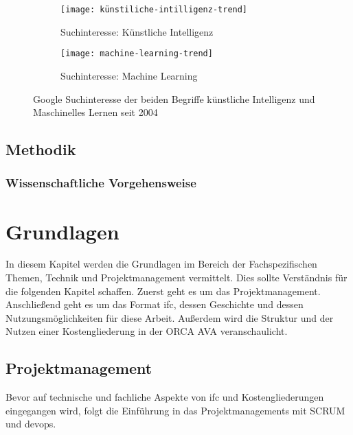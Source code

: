 \begin{figure}[h]
	\centering
	
	\begin{subfigure}{0.99\textwidth}
		\centering
	\texttt{[image: künstiliche-intilligenz-trend]}
		\caption{Suchinteresse: Künstliche Intelligenz}
		\label{FIG:ki-trend}
	\end{subfigure}
	\hspace{1cm}
	\begin{subfigure}{0.99\textwidth}
		\centering
	\texttt{[image: machine-learning-trend]}
		\caption{Suchinteresse: Machine Learning}
		\label{FIG:ml-trend}
	\end{subfigure}
	
	\caption[Google Trends]{Google Suchinteresse der beiden Begriffe \glqq künstliche Intelligenz\grqq{} und \glqq Maschinelles Lernen{} seit 2004}
	\label{fig:ki-ml-trend}
\end{figure}


\subsection{Methodik}
\label{c:intro:methodology}
\subsubsection{Wissenschaftliche Vorgehensweise}
\label{c:intro:methodology:scientific_proceture}

\section{Grundlagen}
\label{s:basics}
In diesem Kapitel werden die Grundlagen im Bereich der Fachspezifischen Themen, Technik und Projektmanagement vermittelt. Dies sollte Verständnis für die folgenden Kapitel schaffen. Zuerst geht es um das Projektmanagement. Anschließend geht es um das Format \ac{ifc}, dessen Geschichte und dessen Nutzungsmöglichkeiten für diese Arbeit. Außerdem wird die Struktur und der Nutzen einer Kostengliederung in der ORCA AVA veranschaulicht.

\subsection{Projektmanagement}
\label{s:basics:project-management}
Bevor auf technische und fachliche Aspekte von \ac{ifc} und Kostengliederungen eingegangen wird, folgt die Einführung in das Projektmanagements mit SCRUM und \ac{devops}.

